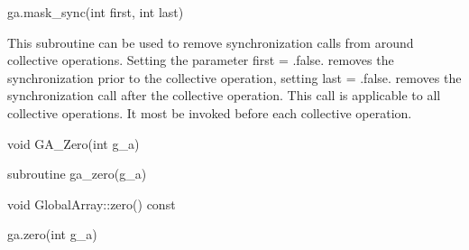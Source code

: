 \documentclass[10pt]{article}
\begin{document}
\begin{pyapi}
\begin{pycode}
ga.mask_sync(int first, int last)
\end{pycode}
\end{pyapi}
\begin{funcargs}
\end{funcargs}

\dcoll

\begin{desc}

This subroutine can be used to remove synchronization calls from around
collective operations. Setting the parameter first = .false. removes the
synchronization prior to the collective operation, setting last = .false.
removes the synchronization call after the collective operation. This call is
applicable to all collective operations.  It most be invoked before each
collective operation.

\end{desc}



\begin{capi}
\begin{ccode}
void GA_Zero(int g_a)
\end{ccode}
\begin{funcargs}
\end{funcargs}
\end{capi}

\begin{fapi}
\begin{fcode}
subroutine ga_zero(g_a)
\end{fcode}
\begin{funcargs}
\end{funcargs}
\end{fapi}

\begin{cxxapi}
\begin{cxxcode}
void GlobalArray::zero() const
\end{cxxcode}
\end{cxxapi}

\begin{pyapi}
\begin{pycode}
ga.zero(int g_a)
\end{pycode}
\begin{funcargs}
\end{funcargs}
\end{pyapi}
\end{document}
